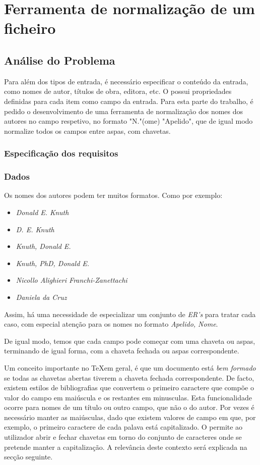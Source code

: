 \chapter{Ferramenta de normalização de um ficheiro }
\label{chap:b1}



\section{Análise do Problema}
\label{sec:b1p:b1}
Para além dos tipos de entrada, é necessário especificar o conteúdo da entrada,
como nomes de autor, títulos de obra, editora, etc. O  possui
propriedades definidas para cada item como campo da entrada.  
Para esta parte do trabalho, é pedido o desenvolvimento de uma ferramenta de
normalização dos nomes dos autores no campo respetivo, no formato "N."(ome)
"Apelido", que de igual modo normalize todos os campos entre aspas, com
chavetas. 

\subsection{Especificação dos requisitos}
\label{sec:spec:b1}

\subsection{Dados}
Os nomes dos autores podem ter muitos formatos. Como por exemplo:

\begin{itemize}
	\item \emph{Donald E. Knuth}
	\item \emph{D. E. Knuth}
	\item \emph{Knuth, Donald E.}
	\item \emph{Knuth, PhD, Donald E.}
	\item \emph{Nicollo Alighieri Franchi-Zanettachi}
	\item \emph{Daniela da Cruz}
\end{itemize}

Assim, há uma necessidade de especializar um conjunto de \emph{ER's} para tratar
cada caso, com especial atenção para os nomes no formato \emph{Apelido, Nome}.

De igual modo, temos que cada campo pode começar com uma chaveta ou aspas,
terminando de igual forma, com a chaveta fechada ou aspas correspondente.

Um conceito importante no \TeX em geral, é que um documento está \emph{bem
formado} se todas as chavetas abertas tiverem a chaveta fechada correspondente.
De facto, existem estilos de bibliografias que convertem o primeiro caractere
que compõe o valor do campo em maiúscula e os restantes em minusculas. Esta
funcionalidade ocorre para nomes de um título ou outro campo, que não o do
autor. Por vezes é necessário manter as maiúsculas, dado que existem valores de
campo em que, por exemplo, o primeiro caractere de cada palava está
capitalizado. O  permite ao utilizador abrir e fechar chavetas em
torno do conjunto de caracteres onde se pretende manter a capitalização.
A relevância deste contexto será explicada na secção seguinte.


